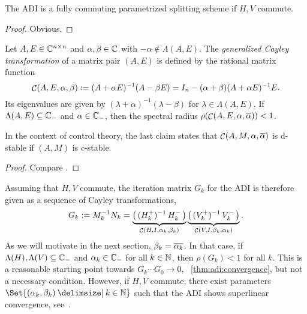 \begin{corollary}
  The ADI is a fully commuting parametrized splitting scheme if $H,V$ commute.
\end{corollary}
\begin{proof}
  Obvious.
\end{proof}

\begin{lemma}
\label{thm:adi:cayley}
  Let $A, E\in\mathbb{C}^{n\times n}$ and $\alpha, \beta \in\mathbb{C}$ with $-\alpha\notin\Lambda(A, E)$.
  The \emph{generalized Cayley transformation} of a matrix pair $(A,E)$ is defined by
  the rational matrix function
  \begin{equation*}
    \mathop{\mathcal{C}}(A, E, \alpha, \beta)
    := (A+\alpha E)^{-1} (A-\beta E)
    = I_n - (\alpha + \beta) (A+\alpha E)^{-1} E
    .
  \end{equation*}
  Its eigenvalues are given by
  $(\lambda + \alpha)^{-1} (\lambda - \beta)$
  for $\lambda\in\Lambda(A, E)$.
  If $\Lambda(A, E) \subseteq \mathbb{C}_-$ and $\alpha\in\mathbb{C}_-$,
  then the spectral radius $\rho(\Cayley(A,E,\alpha,\conj\alpha)) < 1$.
\end{lemma}
\begin{remark}
  In the context of control theory,
  the last claim states that
  $\Cayley(A, M, \alpha, \conj\alpha)$ is d-stable if
  $(A, M)$ is c-stable.
\end{remark}
\begin{proof}
  Compare \cite[Proposition~2.16]{Kuerschner2016}.
\end{proof}

Assuming that $H, V$ commute,
the iteration matrix $G_k$ for the \ac{ADI} is therefore given as a sequence of Cayley transformations,
\begin{equation}
\label{eq:adi:cayley}
  G_k
  := M_k^{-1} N_k
  = \underbrace{
    \big( \mathop{(\mathop{H_k^+})^{-1}}\mathop{H_k^-} \big)
  }_{
    \mathop{\mathcal{C}}(H, I, \alpha_k, \beta_k)
  } \underbrace{
    \big( \mathop{(\mathop{V_k^+})^{-1}}\mathop{V_k^-} \big)
  }_{
    \mathop{\mathcal{C}}(V, I, \beta_k, \alpha_k)
  }
  .
\end{equation}
As we will motivate in the next section, $\beta_k = \conj{\alpha_k}$.
In that case, if $\Lambda(H), \Lambda(V) \subseteq \mathbb{C}_-$
and $\alpha_k \in \mathbb{C}_-$ for all $k\in\mathbb{N}$, then $\rho(G_k) < 1$ for all $k$.
This is a reasonable starting point towards $G_k\cdots G_0 \to 0$,
\cf~\autoref{thm:adi:convergence},
but not a necessary condition.
However, if $H, V$ commute,
there exist parameters $\Set{(\alpha_k, \beta_k) \given k\in\N}$
such that the \ac{ADI} shows
superlinear convergence, see~\cite{Beckermann2010}.

